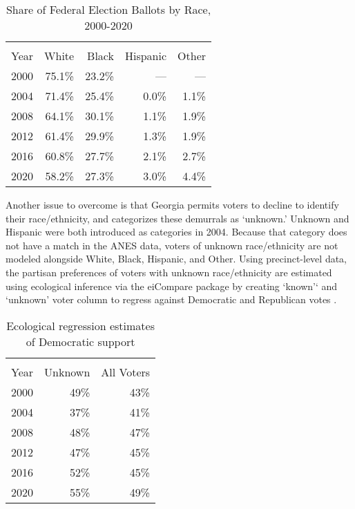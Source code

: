 \begin{table}[ht]
\begin{center}
\begin{threeparttable}
\caption{Share of Federal Election Ballots by Race, 2000-2020} 
\label{tab:vottes-race-pct}
\begin{tabular}{rrrrr}
  \hline \\ \vspace{0.5em}
Year & White & Black & Hispanic & Other \vspace{0.5em} \\ 
  \hline
2000 & 75.1\% & 23.2\% & --- & --- \\ 
  2004 & 71.4\% & 25.4\% & 0.0\% & 1.1\% \\ 
  2008 & 64.1\% & 30.1\% & 1.1\% & 1.9\% \\ 
  2012 & 61.4\% & 29.9\% & 1.3\% & 1.9\% \\ 
  2016 & 60.8\% & 27.7\% & 2.1\% & 2.7\% \\ 
  2020 & 58.2\% & 27.3\% & 3.0\% & 4.4\% \\ 
   \hline 
\end{tabular}
\end{threeparttable}
\end{center}
\end{table}


Another issue to overcome is that Georgia permits voters to decline to identify their race/ethnicity, and categorizes these demurrals as `unknown.' Unknown and Hispanic were both introduced as categories in 2004. Because that category does not have a match in the ANES data, voters of unknown race/ethnicity are not modeled alongside White, Black, Hispanic, and Other. Using precinct-level data, the partisan preferences of voters with unknown race/ethnicity are estimated using ecological inference via the eiCompare package by creating `known'` and `unknown' voter column to regress against Democratic and Republican votes \citep{collingwood_eicompare_2020}. 


\begin{table}[ht]
\begin{center}
\begin{threeparttable}
\caption{Ecological regression estimates of Democratic support}
\label{tab:unknowns}
\begin{tabular}{rrr}
  \hline \\ \vspace{0.5em}
Year & Unknown  & All Voters \vspace{0.5em}\\ 
  \hline
  2000 & 49\% & 43\% \\ 
  2004 & 37\% & 41\% \\ 
2008 & 48\% & 47\% \\ 
  2012 & 47\% & 45\% \\ 
  2016 & 52\% & 45\% \\ 
  2020 & 55\% & 49\%\vspace{0.5em}\\ 
   \hline
\end{tabular}
\end{threeparttable}
\end{center}
\end{table}

